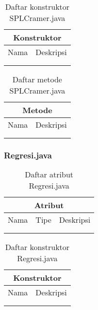 \begin{table}[H]
    \centering
    \begin{tabular}{c|c}
        \hline
        \hline
        \multicolumn{2}{c}{\textbf{Konstruktor}}\\
        \hline
        \hline
         Nama  & Deskripsi \\
         \hline 
         \hline 
         &  \\
         &  \\
    \end{tabular}
    \caption{Daftar konstruktor SPLCramer.java}
\end{table}

\begin{table}[H]
    \centering
    \begin{tabular}{c|c}
        \hline
        \hline
        \multicolumn{2}{c}{\textbf{Metode}}\\
        \hline
        \hline
         Nama  & Deskripsi \\
         \hline 
         \hline 
         &  \\
         &  \\
    \end{tabular}
    \caption{Daftar metode SPLCramer.java}
\end{table}

\subsubsection{Regresi.java}

\begin{table}[H]
    \centering
    \begin{tabular}{c|c|c}
        \hline
        \hline
        \multicolumn{3}{c}{\textbf{Atribut}}\\
        \hline
        \hline
         Nama & Tipe & Deskripsi \\
         \hline 
         \hline 
         &  & \\
         &  & \\
    \end{tabular}
    \caption{Daftar atribut Regresi.java}
\end{table}

\begin{table}[H]
    \centering
    \begin{tabular}{c|c}
        \hline
        \hline
        \multicolumn{2}{c}{\textbf{Konstruktor}}\\
        \hline
        \hline
         Nama  & Deskripsi \\
         \hline 
         \hline 
         &  \\
         &  \\
    \end{tabular}
    \caption{Daftar konstruktor Regresi.java}
\end{table}

